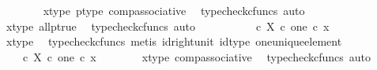 \begin{isabellebody}
\ \ \ \ \ \ \isamarkupfalse%
\ x{\isacharunderscore}{\kern0pt}type\ p{\isacharunderscore}{\kern0pt}type\ comp{\isacharunderscore}{\kern0pt}associative{}\ \isamarkupfalse%
\ {\isacharparenleft}{\kern0pt}typecheck{\isacharunderscore}{\kern0pt}cfuncs{\isacharcomma}{\kern0pt}\ auto{\isacharparenright}{\kern0pt}\isanewline
\ \ \ \ \isamarkupfalse%
\ \isamarkupfalse%
\ {\isachardoublequoteopen}{\isachardot}{\kern0pt}{\isachardot}{\kern0pt}{\isachardot}{\kern0pt}\ {\isacharequal}{\kern0pt}\ {\isasymt}{\isachardoublequoteclose}\isanewline
\ \ \ \ \ \ \isamarkupfalse%
\ x{\isacharunderscore}{\kern0pt}type\ all{\isacharunderscore}{\kern0pt}p{\isacharunderscore}{\kern0pt}true\ \isamarkupfalse%
\ {\isacharparenleft}{\kern0pt}typecheck{\isacharunderscore}{\kern0pt}cfuncs{\isacharcomma}{\kern0pt}\ auto{\isacharparenright}{\kern0pt}\isanewline
\ \ \ \ \isamarkupfalse%
\ \isamarkupfalse%
\ {\isachardoublequoteopen}{\isachardot}{\kern0pt}{\isachardot}{\kern0pt}{\isachardot}{\kern0pt}\ {\isacharequal}{\kern0pt}\ {\isasymt}\ {\isasymcirc}\isactrlsub c\ {\isasymbeta}\isactrlbsub X\ {\isasymtimes}\isactrlsub c\ one\isactrlesub \ {\isasymcirc}\isactrlsub c\ x\ {\isachardoublequoteclose}\isanewline
\ \ \ \ \ \ \isamarkupfalse%
\ x{\isacharunderscore}{\kern0pt}type\ \isamarkupfalse%
\ {\isacharparenleft}{\kern0pt}typecheck{\isacharunderscore}{\kern0pt}cfuncs{\isacharcomma}{\kern0pt}\ metis\ id{\isacharunderscore}{\kern0pt}right{\isacharunderscore}{\kern0pt}unit{}\ id{\isacharunderscore}{\kern0pt}type\ one{\isacharunderscore}{\kern0pt}unique{\isacharunderscore}{\kern0pt}element{\isacharparenright}{\kern0pt}\isanewline
\ \ \ \ \isamarkupfalse%
\ \isamarkupfalse%
\ {\isachardoublequoteopen}{\isachardot}{\kern0pt}{\isachardot}{\kern0pt}{\isachardot}{\kern0pt}\ {\isacharequal}{\kern0pt}\ {\isacharparenleft}{\kern0pt}{\isasymt}\ {\isasymcirc}\isactrlsub c\ {\isasymbeta}\isactrlbsub X\ {\isasymtimes}\isactrlsub c\ one\isactrlesub {\isacharparenright}{\kern0pt}\ {\isasymcirc}\isactrlsub c\ x{\isachardoublequoteclose}\isanewline
\ \ \ \ \ \ \isamarkupfalse%
\ x{\isacharunderscore}{\kern0pt}type\ comp{\isacharunderscore}{\kern0pt}associative{}\ \isamarkupfalse%
\ {\isacharparenleft}{\kern0pt}typecheck{\isacharunderscore}{\kern0pt}cfuncs{\isacharcomma}{\kern0pt}\ auto{\isacharparenright}{\kern0pt}\isanewline
\ \ \ \ \isanewline

\end{isabellebody}
